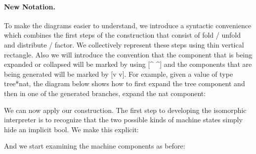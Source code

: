 \documentclass{llncs}
\begin{document}

\paragraph*{New Notation.}
To make the diagrams easier to understand, we introduce a syntactic
convenience which combines the first steps of the construction that consist
of {{fold}} / {{unfold}} and {{distribute}} / {{factor}}. We collectively
represent these steps using thin vertical rectangle. Also we will introduce
the convention that the component that is being expanded or collapsed will be
marked by using {{[^ ^]}} and the components that are being generated will be
marked by {{[v v]}}. For example, given a value of type {{tree*nat}}, the
diagram below shows how to first expand the {{tree}} component and then in
one of the generated branches, expand the {{nat}} component:

\begin{center}
\end{center}

We can now apply our construction. The first step to developing the
isomorphic interpreter is to recognize that the two possible kinds of machine
states simply hide an implicit {{bool}}. We make this explicit:

\begin{multicols}{2}
%

\end{multicols}

And we start examining the machine components as before:

\begin{center}
\end{center}
\end{document}
